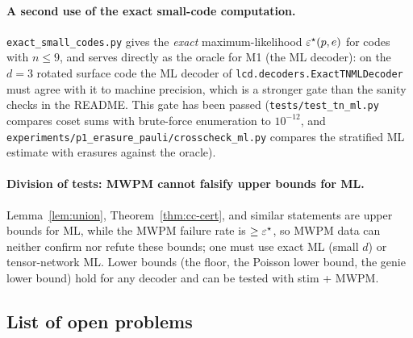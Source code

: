 \paragraph{A second use of the exact small-code computation.}
\texttt{exact\_small\_codes.py} gives the \emph{exact} maximum-likelihood $\varepsilon^{\star}(p,e)$ for codes with $n\le9$, and serves directly as the oracle for M1 (the ML decoder):
on the $d=3$ rotated surface code the ML decoder of \texttt{lcd.decoders.ExactTNMLDecoder} must agree with it to machine precision, which is a stronger gate than the sanity checks in the README.
This gate has been passed (\texttt{tests/test\_tn\_ml.py} compares coset sums with brute-force enumeration to $10^{-12}$, and \texttt{experiments/p1\_erasure\_pauli/crosscheck\_ml.py} compares the stratified ML estimate with erasures against the oracle).

\paragraph{Division of tests: MWPM cannot falsify upper bounds for ML.}
Lemma~\ref{lem:union}, Theorem~\ref{thm:cc-cert}, and similar statements are upper bounds for ML, while the MWPM failure rate is $\ge\varepsilon^{\star}$,
so MWPM data can neither confirm nor refute these bounds; one must use exact ML (small $d$) or tensor-network ML.
Lower bounds (the floor, the Poisson lower bound, the genie lower bound) hold for any decoder and can be tested with stim + MWPM.

\subsection{List of open problems}

